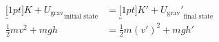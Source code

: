 \begin{align}
  \nonumber
  \underbracket[1pt]{K+U_\text{grav}}_\text{initial state} &=
  \underbracket[1pt]{K'+U_\text{grav}'}_\text{final state}\\
  \frac12mv^2+mgh &= \frac12m(v')^2+mgh'
\end{align}

%
%




